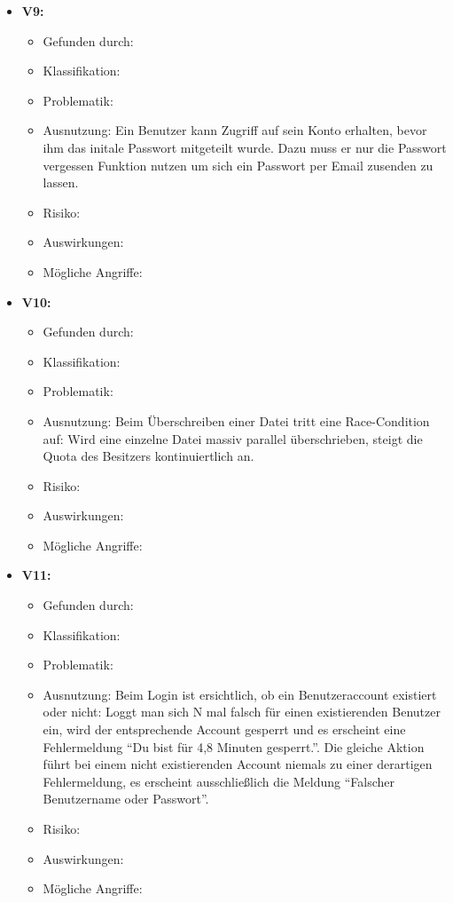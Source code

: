 \documentclass[12pt,DIV14,BCOR10mm,a4paper,parskip=half-,headsepline,headinclude,english,ngerman,bibliography=totocnumbered]{scrreprt}
\begin{document}
\begin{itemize}
  \hypertarget{vulnerability9}{}
  \item \textbf{V9: }
  \begin{itemize}
  \item Gefunden durch:
  \item Klassifikation: 
  \item Problematik:
  \item Ausnutzung: Ein Benutzer kann Zugriff auf sein Konto erhalten, bevor ihm das initale Passwort mitgeteilt wurde. Dazu muss er nur die Passwort vergessen Funktion nutzen um sich ein Passwort per Email zusenden zu lassen.
  \item Risiko: 
  \item Auswirkungen: 
  \item Mögliche Angriffe:
  \end{itemize}

  \hypertarget{vulnerability10}{}
  \item \textbf{V10: }
  \begin{itemize}
  \item Gefunden durch:
  \item Klassifikation: 
  \item Problematik: 
  \item Ausnutzung: Beim Überschreiben einer Datei tritt eine Race-Condition auf: Wird eine einzelne Datei massiv parallel überschrieben, steigt die Quota des Besitzers kontinuiertlich an.
  \item Risiko: 
  \item Auswirkungen: 
  \item Mögliche Angriffe:
  \end{itemize}

  \hypertarget{vulnerability11}{}
  \item \textbf{V11: }
  \begin{itemize}
  \item Gefunden durch:
  \item Klassifikation: 
  \item Problematik:
  \item Ausnutzung: Beim Login ist ersichtlich, ob ein Benutzeraccount existiert oder nicht: Loggt man sich N mal falsch für einen existierenden Benutzer ein, wird der entsprechende Account gesperrt und es erscheint eine Fehlermeldung \enquote{Du bist für 4,8 Minuten gesperrt.}. Die gleiche Aktion führt bei einem nicht existierenden Account niemals zu einer derartigen Fehlermeldung, es erscheint ausschließlich die Meldung \enquote{Falscher Benutzername oder Passwort}.
  \item Risiko: 
  \item Auswirkungen: 
  \item Mögliche Angriffe:
  \end{itemize}


\end{itemize}
\end{document}
